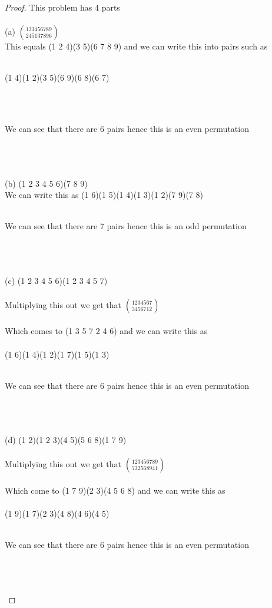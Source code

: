 \documentclass[12pt]{article}
\begin{document}
\begin{proof}
This problem has 4 parts \\ \\
(a) $\displaystyle{123456789 \choose 245137896}$ \\
This equals (1 2 4)(3 5)(6 7 8 9) and we can write this into pairs such as \\ \\
\centerline{(1 4)(1 2)(3 5)(6 9)(6 8)(6 7)} \\ \\
\centerline{We can see that there are 6 pairs hence this is an even permutation} \\ \\ \\
(b) (1 2 3 4 5 6)(7 8 9) \\
We can write this as (1 6)(1 5)(1 4)(1 3)(1 2)(7 9)(7 8) \\ \\
\centerline{We can see that there are 7 pairs hence this is an odd permutation} \\ \\ \\
(c) (1 2 3 4 5 6)(1 2 3 4 5 7) \\ \\
Multiplying this out we get that $\displaystyle{1234567 \choose 3456712}$ \\ \\
Which comes to (1 3 5 7 2 4 6) and we can write this as \\ \\
(1 6)(1 4)(1 2)(1 7)(1 5)(1 3) \\ \\
\centerline{We can see that there are 6 pairs hence this is an even permutation} \\ \\ \\
(d) (1 2)(1 2 3)(4 5)(5 6 8)(1 7 9) \\ \\
Multiplying this out we get that $\displaystyle{123456789 \choose 732568941}$ \\ \\
Which come to (1 7 9)(2 3)(4 5 6 8) and we can write this as \\ \\
(1 9)(1 7)(2 3)(4 8)(4 6)(4 5) \\ \\ 
\centerline{We can see that there are 6 pairs hence this is an even permutation} \\ \\ \\
\end{proof}
\end{document}
